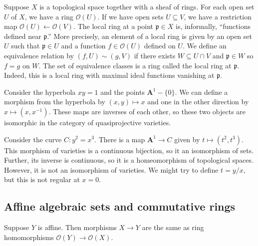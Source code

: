\documentclass [11 pt, oneside] {article}
\begin{document}
Suppose $X$ is a topological space together with a sheaf of rings. For each open set $U$ of $X$, we have a ring $\mathscr{O}(U)$. If we have open sets $U\subseteq V$, we have a restriction map $\mathscr{O} (U)  \longleftarrow \mathscr{O}(V)$. The local ring at a point $\mathfrak{p}\in X$ is, informally, ``functions defined near $\mathfrak{p}$.'' More precisely, an element of a local ring is given by an open set $U$ such that $\mathfrak{p}\in U$ and a function $f\in \mathscr{O}(U)$ defined on $U$. We define an equivalence relation by $(f,U)\sim  (g,V)$ if there exists $W\subseteq U\cap V$ and $\mathfrak{p}\in W$  so $f=g$ on $W$. The set of equivalence classes is a ring called the local ring at $\mathfrak{p}$. Indeed, this is a local ring with maximal ideal functions vanishing at $\mathfrak{p}$.

\begin{example}[ ]\label{}
Consider the hyperbola $xy=1$ and the points $\mathbf{A}^1-\{0\}$. We can define a morphism from the hyperbola by $(x,y)\longmapsto x$ and one in the other direction by $x\longmapsto (x,x^{-1})$. These maps are inverses of each other, so these two objects are isomorphic in the category of quasiprojective varieties.
\end{example}

\begin{example}[ ]\label{}
Consider the curve $C: y^2=x^3$. There is a map $\mathbf{A}^1\longrightarrow C$ given by $t\longmapsto (t^2,t^3)$. This morphism of varieties is a continuous bijection, so it an isomorphism of sets. Further, its inverse is continuous, so it is a homeomorphism of topological spaces. However, it is not an isomorphism of varieties. We might try to define $t = y/x$, but this is not regular at $x=0$.
\end{example}

\subsection{Affine algebraic sets and commutative rings}
\begin{theorem}[ ]\label{}\index{}
Suppose $Y$ is affine. Then morphisms $X\longrightarrow Y$ are the same as ring homomorphisms $\mathscr{O}(Y)  \longrightarrow \mathscr{O}(X)$.
\end{theorem}
\end{document}
